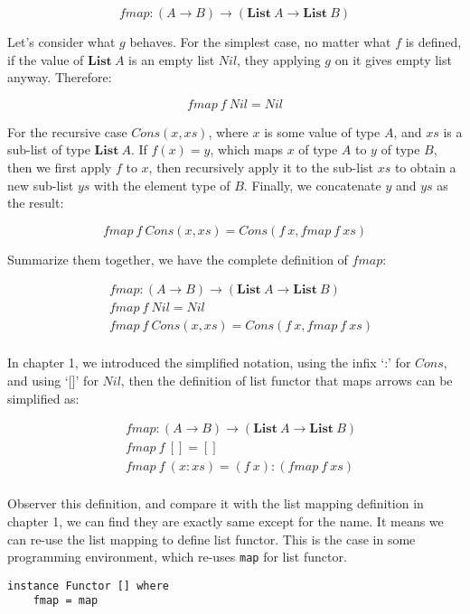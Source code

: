 \documentclass{article}
\begin{document}
\begin{example}
\[
fmap: (A \to B) \to (\mathbf{List}\ A \to \mathbf{List}\ B)
\]

Let's consider what $g$ behaves. For the simplest case, no matter what $f$ is defined, if the value of $\mathbf{List}\ A$ is an empty list $Nil$, they applying $g$ on it gives empty list anyway. Therefore:

\[
fmap\ f\ Nil = Nil
\]

For the recursive case $Cons(x, xs)$, where $x$ is some value of type $A$, and $xs$ is a sub-list of type $\mathbf{List}\ A$. If $f(x) = y$, which maps $x$ of type $A$ to $y$ of type $B$, then we first apply $f$ to $x$, then recursively apply it to the sub-list $xs$ to obtain a new sub-list $ys$ with the element type of $B$. Finally, we concatenate $y$ and $ys$ as the result:

\[
fmap\ f\ Cons(x, xs) = Cons(f\ x, fmap\ f\ xs)
\]

Summarize them together, we have the complete definition of $fmap$:

\[
\begin{array}{l}
\quad    fmap : (A \to B) \to (\mathbf{List}\ A \to \mathbf{List}\ B) \\
\quad    fmap\ f\ Nil = Nil \\
\quad    fmap\ f\ Cons(x, xs) = Cons(f\ x, fmap\ f\ xs) \\
\end{array}
\]

In chapter 1, we introduced the simplified notation, using the infix `:' for $Cons$, and using `[]' for $Nil$, then the definition of list functor that maps arrows can be simplified as:

\[
\begin{array}{l}
\quad    fmap : (A \to B) \to (\mathbf{List}\ A \to \mathbf{List}\ B) \\
\quad    fmap\ f\ [] = [] \\
\quad    fmap\ f\ (x:xs) = (f\ x):(fmap\ f\ xs) \\
\end{array}
\]

Observer this definition, and compare it with the list mapping definition in chapter 1, we can find they are exactly same except for the name. It means we can re-use the list mapping to define list functor. This is the case in some programming environment, which re-uses \texttt{map} for list functor.

\lstset{frame=single}
\begin{lstlisting}
instance Functor [] where
    fmap = map
\end{lstlisting}


\end{example}
\end{document}
